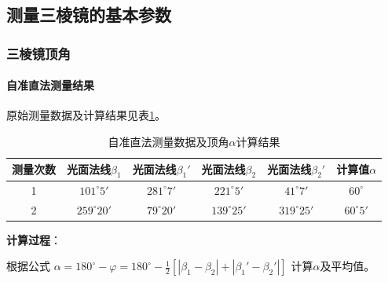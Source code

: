 \documentclass[11pt]{article}
\begin{document}
\subsection{测量三棱镜的基本参数}

\subsubsection{三棱镜顶角}

\paragraph{自准直法测量结果}

原始测量数据及计算结果见表\ref{tab:beta_alpha_data1}。

\begin{table}[htbp]
  \centering
  \caption{自准直法测量数据及顶角$\alpha$计算结果}
  \vspace{0.5em}
  \label{tab:beta_alpha_data1}
  \begin{tabular}{cccccc}
    \toprule
    测量次数 & 光面法线$\beta_1$ & 光面法线$\beta_1'$ & 光面法线$\beta_2$ & 光面法线$\beta_2'$ & 计算值$\alpha$ \\
    \midrule
    1 & $101^\circ5'$ & $281^\circ7'$ & $221^\circ5'$ & $41^\circ7'$ & $60^\circ$ \\
    2 & $259^\circ20'$ & $79^\circ20'$ & $139^\circ25'$ & $319^\circ25'$ & $60^\circ5'$ \\
    \bottomrule
  \end{tabular}
\end{table}

\textbf{计算过程}：

根据公式 $\alpha = 180^\circ - \varphi = 180^\circ - \frac{1}{2}\left[|\beta_1 - \beta_2| + |\beta_1' - \beta_2'|\right]$ 计算$\alpha$及平均值。
\end{document}
